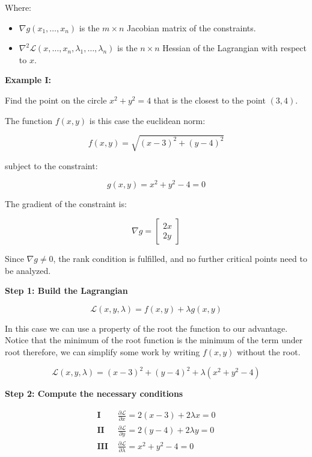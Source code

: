 Where:

\begin{itemize}

    \item \( \nabla  g(x_1, \dots, x_n) \) is the \( m \times n \) Jacobian matrix of the constraints.

    \item \( \nabla^2 \mathcal{L}(x, \dots, x_n, \lambda_1, \dots, \lambda_n) \) is the \( n \times n \) 
          Hessian of the Lagrangian with respect to \(x\).

\end{itemize}

\textbf{Example I:}

Find the point on the circle \(x^2 + y^2 = 4\) that is the closest to the point \((3,4)\).

The function \(f(x,y)\) is this case the euclidean norm:

\[
    f(x, y) = \sqrt{(x - 3)^2 + (y - 4)^2}
\]

subject to the constraint:

\[
    g(x, y) = x^2 + y^2 - 4 = 0
\]

The gradient of the constraint is:

\[
    \nabla g = \begin{bmatrix} 2x \\ 2y \end{bmatrix}
\]

Since \( \nabla g \ne 0 \), the rank condition is fulfilled, and no further critical points 
need to be analyzed.

\textbf{Step 1: Build the Lagrangian}

\[
    \mathcal{L}(x, y, \lambda) = f(x, y) + \lambda g(x, y)
\]

In this case we can use a property of the root the function to our advantage. Notice that the minimum 
of the root function is the minimum of the term under root therefore, we can simplify some work by writing 
\(f(x,y)\) without the root. 

\[
    \mathcal{L}(x, y, \lambda) = (x - 3)^2 + (y - 4)^2 + \lambda (x^2 + y^2 - 4)
\]

\textbf{Step 2: Compute the necessary conditions}

\begin{align*}
   \textbf{I } &\frac{\partial \mathcal{L}}{\partial x} = 2(x - 3) + 2\lambda x = 0 \\
   \textbf{II } &\frac{\partial \mathcal{L}}{\partial y} = 2(y - 4) + 2\lambda y = 0 \\
   \textbf{III } &\frac{\partial \mathcal{L}}{\partial \lambda} = x^2 + y^2 - 4 = 0
\end{align*}


